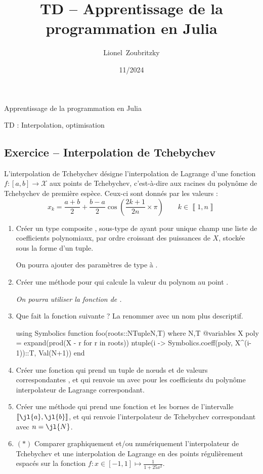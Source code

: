 \documentclass{article}
\title{TD -- Apprentissage de la programmation en Julia}
\author{Lionel~Zoubritzky}
\date{11/2024}
\newcounter{loop}
\newcounter{numEx}
\newcommand{\exo}[1]{
	\stepcounter{numEx}
	\setcounter{loop}{0}
	\subsection*{Exercice \arabic{numEx} -- #1}
}
\newcommand{\llbra}{\left\llbracket}
\newcommand{\rrbra}{\right\rrbracket}
\renewcommand{\brack}[1]{\ensuremath{\llbra#1\rrbra}}
\newcommand{\paren}[1]{\ensuremath{\left(#1\right)}}
\newcommand{\interval}[1]{\ensuremath{\left[#1\right]}}
\begin{document}
	
\begin{center}
	\Large Apprentissage de la programmation en Julia
	
	TD  : Interpolation, optimisation
	\vspace{2em}
\end{center}

\exo{Interpolation de Tchebychev}

L'interpolation de Tchebychev désigne l'interpolation de Lagrange d'une fonction $f:\interval{a,b}\to\mathcal X$ aux points de Tchebychev, c'est-à-dire aux racines du polynôme de Tchebychev de première espèce. Ceux-ci sont donnés par les valeurs :
\[x_k = \frac{a+b}2 + \frac{b-a}2\cos\paren{\frac{2k+1}{2n}\times\pi}\qquad k\in\brack{1,n}\]

\begin{enumerate}
	\item Créer un type composite , sous-type de  ayant pour unique champ  une liste de coefficients polynomiaux, par ordre croissant des puissances de $X$, stockée sous la forme d'un tuple.
	
	On pourra ajouter des paramètres de type à .
	
	\item Créer une méthode pour  qui calcule la valeur du polynom  au point .
	
	\textit{On pourra utiliser la fonction \textnormal{} de \textnormal{}.}

	\item Que fait la fonction  suivante ? La renommer avec un nom plus descriptif.
	
	\begin{jlrepl}
		using Symbolics
		function foo(roots::NTuple{N,T}) where {N,T}
			@variables X
			poly = expand(prod(X - r for r in roots))
			ntuple(i -> Symbolics.coeff(poly, X^(i-1))::T, Val(N+1))
		end
	\end{jlrepl}

	\item Créer une fonction  qui prend un tuple de nœuds  et de valeurs correspondantes , et qui renvoie un  avec pour  les coefficients du polynôme interpolateur de Lagrange correspondant.

	\item Créer une méthode  qui prend une fonction  et les bornes de l'intervalle $\brack{\jl{a},\jl{b}}$, et qui renvoie l'interpolateur de Tchebychev correspondant avec $n = \jl{N}$.
	
	\item $(*)$ Comparer graphiquement et/ou numériquement l'interpolateur de Tchebychev et une interpolation de Lagrange en des points régulièrement espacés sur la fonction $f:x\in\interval{-1,1}\mapsto\frac1{1+25x^2}$.
\end{enumerate}
\end{document}
